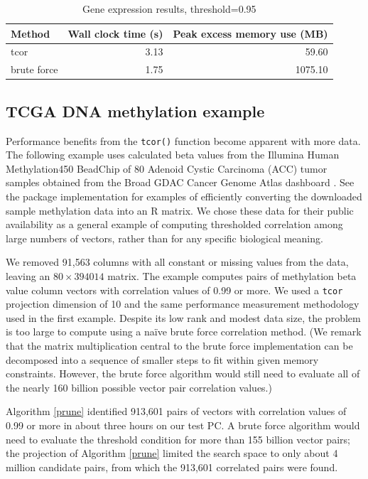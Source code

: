 \documentclass[article]{jss}
\numberwithin{algorithmctr}{section}
\begin{document}
\begin{table}[ht]
\centering
{\small
\begin{tabular}{lrr}
  \hline
Method & Wall clock time (s) & Peak excess memory use (MB) \\ 
  \hline
tcor & 3.13 & 59.60 \\ 
  brute force & 1.75 & 1075.10 \\ 
   \hline
\end{tabular}
}
\caption{Gene expression results, threshold=0.95} 
\label{EisenYeast}
\end{table}


\subsection{TCGA DNA methylation example}

Performance benefits from the {\tt tcor()} function become apparent with more
data.  The following example uses calculated beta values from the Illumina
Human Methylation450 BeadChip of 80 Adenoid Cystic Carcinoma (ACC) tumor
samples obtained from the Broad GDAC Cancer Genome Atlas dashboard \citep{gdac}.
See the  package implementation \citep{sup} for examples of
efficiently converting the downloaded sample methylation data into an R matrix.
We chose these data for their public availability as a general example of
computing thresholded correlation among large numbers of vectors,
rather than for any specific biological meaning.

We removed 91,563 columns with all constant or missing values from the data,
leaving an $80\times 394014$ matrix. The example computes pairs of methylation
beta value column vectors with correlation values of 0.99 or more. We used a
{\tt tcor} projection dimension of 10 and the same performance measurement
methodology used in the first example. Despite its low rank and modest data
size, the problem is too large to compute using a na\"ive brute force
correlation method.  (We remark that the matrix multiplication central to the
brute force implementation can be decomposed into a sequence of smaller steps
to fit within given memory constraints. However, the brute force algorithm
would still need to evaluate all of the nearly 160 billion possible vector pair
correlation values.)

Algorithm \ref{prune} identified 913,601 pairs of vectors with correlation
values of 0.99 or more in about three hours on our test PC. A brute force
algorithm would need to evaluate the threshold condition for more than 155
billion vector pairs; the projection of Algorithm \ref{prune} limited the
search space to only about 4 million candidate pairs, from which the 913,601
correlated pairs were found.
\end{document}

